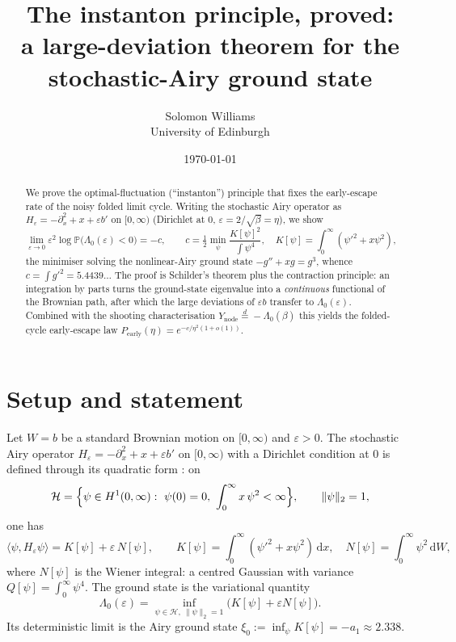 \documentclass[11pt]{article}
\title{\textbf{The instanton principle, proved:\\ a large-deviation theorem for the
stochastic-Airy ground state}}
\author{Solomon Williams \\ \small University of Edinburgh}
\date{\today}
\theoremstyle{remark}
\newcommand{\dd}{\,\mathrm{d}}
\newcommand{\Hform}{\mathcal H}
\newcommand{\Kf}{K}
\newcommand{\Qf}{Q}
\newcommand{\Lam}{\Lambda_0}
\begin{document}
\maketitle

\begin{abstract}\noindent
We prove the optimal-fluctuation (``instanton'') principle that fixes the early-escape
rate of the noisy folded limit cycle. Writing the stochastic Airy operator as
$H_\varepsilon=-\partial_x^2+x+\varepsilon b'$ on $[0,\infty)$ (Dirichlet at $0$,
$\varepsilon=2/\sqrt\beta=\eta$), we show
\[
  \lim_{\varepsilon\to0}\varepsilon^2\log\mathbb P\bigl(\Lam(\varepsilon)<0\bigr)=-c,
  \qquad
  c=\tfrac12\min_{\psi}\frac{\Kf[\psi]^2}{\int\psi^4},\quad \Kf[\psi]=\int_0^\infty(\psi'^2+x\psi^2),
\]
the minimiser solving the nonlinear-Airy ground state $-g''+xg=g^3$, whence
$c=\int g'^2=5.4439\ldots$ The proof is Schilder's theorem plus the contraction
principle: an integration by parts turns the ground-state eigenvalue into a
\emph{continuous} functional of the Brownian path, after which the large deviations of
$\varepsilon b$ transfer to $\Lam(\varepsilon)$. Combined with the shooting
characterisation $Y_{\mathrm{node}}\stackrel{d}{=}-\Lam(\beta)$ this yields the
folded-cycle early-escape law $P_{\mathrm{early}}(\eta)=e^{-c/\eta^2(1+o(1))}$.
\end{abstract}

\section{Setup and statement}

Let $W=b$ be a standard Brownian motion on $[0,\infty)$ and $\varepsilon>0$. The
stochastic Airy operator $H_\varepsilon=-\partial_x^2+x+\varepsilon b'$ on $[0,\infty)$
with a Dirichlet condition at $0$ is defined through its quadratic form \cite{RRV}: on
\[
  \Hform=\Bigl\{\psi\in H^1(0,\infty):\ \psi(0)=0,\ \int_0^\infty x\,\psi^2<\infty\Bigr\},
  \qquad \|\psi\|_2=1,
\]
one has
\begin{equation}\label{eq:rayleigh}
  \langle\psi,H_\varepsilon\psi\rangle
  =\Kf[\psi]+\varepsilon\,N[\psi],
  \qquad
  \Kf[\psi]=\int_0^\infty(\psi'^2+x\psi^2)\dd x,\quad
  N[\psi]=\int_0^\infty\psi^2\dd W,
\end{equation}
where $N[\psi]$ is the Wiener integral: a centred Gaussian with variance
$\Qf[\psi]=\int_0^\infty\psi^4$. The ground state is the variational quantity
\begin{equation}\label{eq:variational}
  \Lam(\varepsilon)=\inf_{\psi\in\Hform,\ \|\psi\|_2=1}\bigl(\Kf[\psi]+\varepsilon N[\psi]\bigr).
\end{equation}
Its deterministic limit is the Airy ground state $\xi_0:=\inf_\psi \Kf[\psi]=-a_1\approx2.338$.
\end{document}
